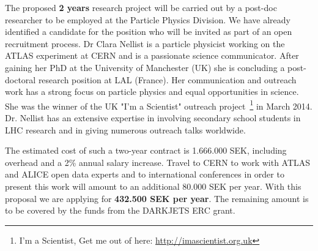 \documentclass[a4paper,justified]{tufte-handout}
\begin{document}

The proposed \textbf{2 years} research project will be carried out by a post-doc researcher to be employed at the Particle Physics Division. We have already identified a candidate for the position who will be invited as part of an open recruitment process. Dr Clara Nellist is a particle physicist working on the ATLAS experiment at CERN and is a passionate science communicator. After gaining her PhD at the University of Manchester (UK) she is concluding a post-doctoral research position at LAL (France). 
Her communication and outreach work has a strong focus on particle physics and equal opportunities in science. She was the winner of the UK "I'm a Scientist" outreach project~\footnote{I'm a Scientist, Get me out of here: \url{http://imascientist.org.uk}} in March 2014. Dr. Nellist has an extensive expertise in involving secondary school students in LHC research and in giving numerous outreach talks worldwide. 

The estimated cost of such a two-year contract is 1.666.000 SEK, including overhead and a 2\% annual salary increase. Travel to CERN to work with ATLAS and ALICE open data experts and to international conferences in order to present this work will amount to an additional 80.000 SEK per year. With this proposal we are applying for \textbf{432.500 SEK per year}. The remaining amount is to be covered by the funds from the DARKJETS ERC grant.  

\end{document}
